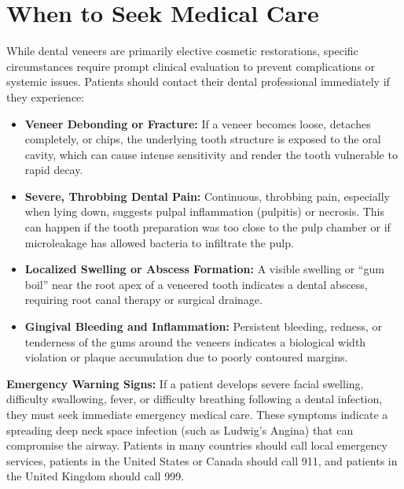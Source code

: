 \section*{When to Seek Medical Care}
While dental veneers are primarily elective cosmetic restorations, specific circumstances require prompt clinical evaluation to prevent complications or systemic issues. Patients should contact their dental professional immediately if they experience:
\begin{itemize}
    \item \textbf{Veneer Debonding or Fracture:} If a veneer becomes loose, detaches completely, or chips, the underlying tooth structure is exposed to the oral cavity, which can cause intense sensitivity and render the tooth vulnerable to rapid decay.
    \item \textbf{Severe, Throbbing Dental Pain:} Continuous, throbbing pain, especially when lying down, suggests pulpal inflammation (pulpitis) or necrosis. This can happen if the tooth preparation was too close to the pulp chamber or if microleakage has allowed bacteria to infiltrate the pulp.
    \item \textbf{Localized Swelling or Abscess Formation:} A visible swelling or ``gum boil'' near the root apex of a veneered tooth indicates a dental abscess, requiring root canal therapy or surgical drainage.
    \item \textbf{Gingival Bleeding and Inflammation:} Persistent bleeding, redness, or tenderness of the gums around the veneers indicates a biological width violation or plaque accumulation due to poorly contoured margins.
\end{itemize}
\textbf{Emergency Warning Signs:}
If a patient develops severe facial swelling, difficulty swallowing, fever, or difficulty breathing following a dental infection, they must seek immediate emergency medical care. These symptoms indicate a spreading deep neck space infection (such as Ludwig's Angina) that can compromise the airway. Patients in many countries should call local emergency services, patients in the United States or Canada should call 911, and patients in the United Kingdom should call 999.

